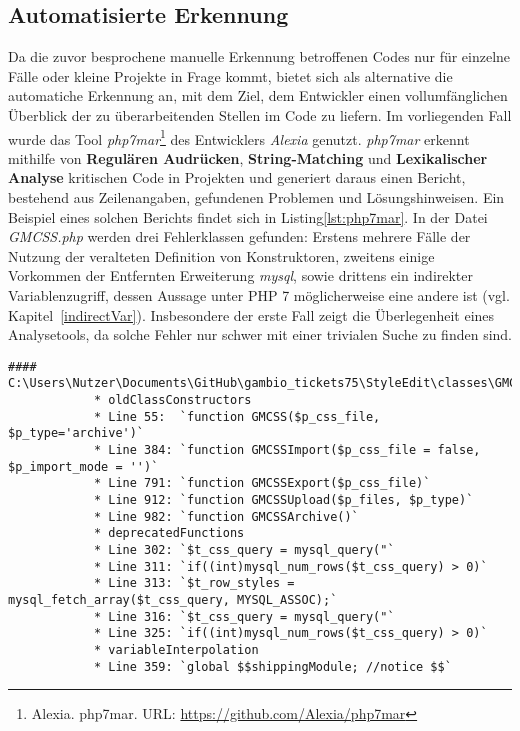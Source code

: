     \subsection{Automatisierte Erkennung}
        Da die zuvor besprochene manuelle Erkennung betroffenen Codes nur für einzelne Fälle oder kleine Projekte in Frage kommt, bietet sich als alternative die 
        automatiche Erkennung an, mit dem Ziel, dem Entwickler einen vollumfänglichen Überblick der zu überarbeitenden Stellen im Code zu liefern. Im vorliegenden Fall
        wurde das Tool \textit{\ac{php7mar}}\footnote{Alexia. php7mar. URL: \url{https://github.com/Alexia/php7mar}} des Entwicklers \textit{Alexia} genutzt.
        \textit{\ac{php7mar}} erkennt mithilfe von \textbf{Regulären Audrücken}, \textbf{String-Matching} und \textbf{Lexikalischer Analyse} kritischen Code in 
        Projekten und generiert daraus einen Bericht, bestehend aus Zeilenangaben, gefundenen Problemen und Lösungshinweisen. Ein Beispiel eines solchen Berichts findet
        sich in Listing\ref{lst:php7mar}. In der Datei \textit{GMCSS.php} werden drei Fehlerklassen gefunden: Erstens mehrere Fälle der Nutzung der veralteten Definition von
        Konstruktoren, zweitens einige Vorkommen der Entfernten Erweiterung \textit{mysql}, sowie drittens ein indirekter Variablenzugriff, dessen Aussage unter PHP 7
        möglicherweise eine andere ist (vgl. Kapitel~\ref{indirectVar}). Insbesondere der erste Fall zeigt die Überlegenheit eines Analysetools, da solche Fehler nur
        schwer mit einer trivialen Suche zu finden sind.

        \begin{lstlisting}[caption={Beispiel eines generierten Berichts mit \textit{\ac{php7mar}}}, label={lst:php7mar}]
            #### C:\Users\Nutzer\Documents\GitHub\gambio_tickets75\StyleEdit\classes\GMCSS.php
            * oldClassConstructors
            * Line 55:  `function GMCSS($p_css_file, $p_type='archive')`
            * Line 384: `function GMCSSImport($p_css_file = false, $p_import_mode = '')`
            * Line 791: `function GMCSSExport($p_css_file)`
            * Line 912: `function GMCSSUpload($p_files, $p_type)`
            * Line 982: `function GMCSSArchive()`
            * deprecatedFunctions
            * Line 302: `$t_css_query = mysql_query("`
            * Line 311: `if((int)mysql_num_rows($t_css_query) > 0)`
            * Line 313: `$t_row_styles = mysql_fetch_array($t_css_query, MYSQL_ASSOC);`
            * Line 316: `$t_css_query = mysql_query("`
            * Line 325: `if((int)mysql_num_rows($t_css_query) > 0)`
            * variableInterpolation
            * Line 359: `global $$shippingModule; //notice $$`
        \end{lstlisting}

